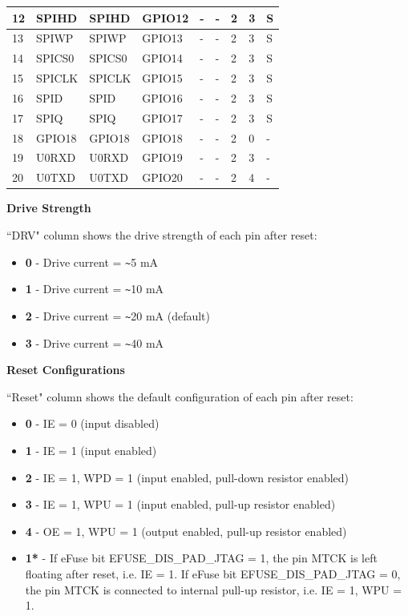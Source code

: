 \begin{longtable}[c]{|p{0.7cm}|p{1.9cm}|p{1.9cm}|p{1.7cm}|p{1.7cm}|p{1.7cm}|p{1cm}|p{1cm}|p{1.0cm}| }
12 & SPIHD           &  SPIHD        & GPIO12  & -          & -            & 2           & 3 & S \\ \hline
13 & SPIWP           &  SPIWP        & GPIO13  & -          & -            & 2           & 3 & S \\ \hline
14 & SPICS0          &  SPICS0       & GPIO14  & -          & -            & 2           & 3 & S \\ \hline
15 & SPICLK          &  SPICLK       & GPIO15  & -          & -            & 2           & 3 & S \\ \hline
16 & SPID            &  SPID         & GPIO16  & -          & -            & 2           & 3 & S \\ \hline
17 & SPIQ            &  SPIQ         & GPIO17  & -          & -            & 2           & 3 & S \\ \hline
18 & GPIO18          &  GPIO18       & GPIO18  & -          & -            & 2           & 0 & - \\ \hline
19 & U0RXD           &  U0RXD        & GPIO19  & -          & -            & 2           & 3 & - \\ \hline
20 & U0TXD           &  U0TXD        & GPIO20  & -          & -            & 2           & 4 & - \\ \hline

    \end{longtable}
\normalsize
\textbf{Drive Strength}

``DRV" column shows the drive strength of each pin after reset:

\begin{itemize}
\item \textbf{0} - Drive current = \verb+~+5 mA
\item \textbf{1} - Drive current = \verb+~+10 mA
\item \textbf{2} - Drive current = \verb+~+20 mA (default)
\item \textbf{3} - Drive current = \verb+~+40 mA
\end{itemize}

\textbf{Reset Configurations}

``Reset" column shows the default configuration of each pin after reset:

\begin{itemize}
\item \textbf{0} - IE = 0 (input disabled)
\item \textbf{1} - IE = 1 (input enabled)
\item \textbf{2} - IE = 1, WPD = 1 (input enabled, pull-down resistor enabled)
\item \textbf{3} - IE = 1, WPU = 1 (input enabled, pull-up resistor enabled)
\item \textbf{4} - OE = 1, WPU = 1 (output enabled, pull-up resistor enabled)
\item \textbf{1*} - If eFuse bit EFUSE\_DIS\_PAD\_JTAG = 1, the pin MTCK is left floating after reset, i.e. IE = 1. If eFuse bit EFUSE\_DIS\_PAD\_JTAG = 0, the pin MTCK is connected to internal pull-up resistor, i.e. IE = 1, WPU = 1.  
\end{itemize}

